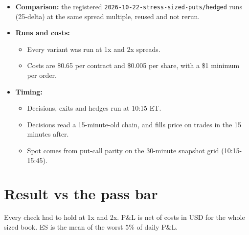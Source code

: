 \documentclass{article}
\begin{document}
\begin{itemize}
\begin{itemize}

\item \texttt{put20} (primary): \texttt{put\_\allowbreak{}delta = 0.\allowbreak{}20};

\item \texttt{put15} (sensitivity): \texttt{put\_\allowbreak{}delta = 0.\allowbreak{}15}.

\end{itemize}

\item \textbf{Comparison:} the registered \texttt{2026-\allowbreak{}10-\allowbreak{}22-\allowbreak{}stress-\allowbreak{}sized-\allowbreak{}puts/\allowbreak{}hedged} runs (25-delta) at the same spread multiple, reused and not rerun.

\item \textbf{Runs and costs:}

\begin{itemize}

\item Every variant was run at 1x and 2x spreads.

\item Costs are \$0.65 per contract and \$0.005 per share, with a \$1 minimum per order.

\end{itemize}

\item \textbf{Timing:}

\begin{itemize}

\item Decisions, exits and hedges run at 10:15 ET.

\item Decisions read a 15-minute-old chain, and fills price on trades in the 15 minutes after.

\item Spot comes from put-call parity on the 30-minute snapshot grid (10:15-15:45).

\end{itemize}

\end{itemize}

\section{Result vs the pass bar}

Every check had to hold at 1x and 2x. P\&L is net of costs in USD for the whole sized book. ES is the mean of the worst 5\% of daily P\&L.
\end{document}
